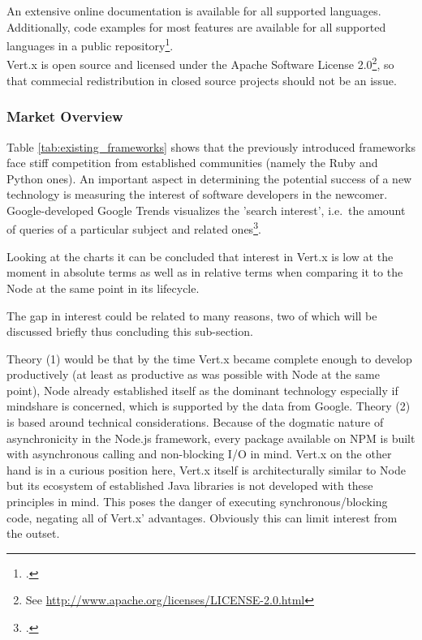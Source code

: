 
An extensive online documentation is available for all supported languages.
Additionally, code examples for most features are available for all supported languages in
a public repository\footcite[Cf.][]{Fox_2013}.\\
Vert.x is open source and licensed under the Apache Software License
2.0\footnote{See \url{http://www.apache.org/licenses/LICENSE-2.0.html}}, so that
commecial redistribution in closed source projects should not be an issue.

\subsubsection{Market Overview}
\label{frameworks_overview}

Table \ref{tab:existing_frameworks} shows that the previously introduced frameworks face stiff competition from established communities (namely the Ruby and Python ones). An important aspect in determining the potential success of a new technology is measuring the interest of software developers in the newcomer. Google-developed Google Trends visualizes the 'search interest', i.e.\ the amount of queries of a particular subject and related ones\footcite{g_trends}.

Looking at the charts it can be concluded that interest in Vert.x is low at the moment in absolute terms as well as in relative terms when comparing it to the Node at the same point in its lifecycle.

The gap in interest could be related to many reasons, two of which will be discussed briefly thus concluding this sub-section.

Theory (1) would be that by the time Vert.x became complete enough to develop productively (at least as productive as was possible with Node at the same point), Node already established itself as the dominant technology especially if mindshare is concerned, which is supported by the data from Google.
Theory (2) is based around technical considerations. Because of the dogmatic nature of asynchronicity in the Node.js framework, every package available on NPM is built with asynchronous calling and non-blocking I/O in mind. Vert.x on the other hand is in a curious position here, Vert.x itself is architecturally similar to Node but its ecosystem of established Java libraries is not developed with these principles in mind. This poses the danger of executing synchronous/blocking code, negating all of Vert.x' advantages. Obviously this can limit interest from the outset.

